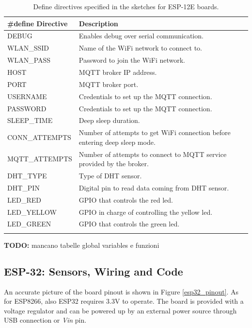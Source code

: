 \noindent\begin{minipage}{\textwidth}
\begingroup
\setlength{\LTleft}{-20cm plus -1fill}
\setlength{\LTright}{\LTleft}
	\begin{longtable}{l | l}
		\hline
		\textbf{\#define Directive} & \textbf{Description} \\
		\hline
		\hline
		DEBUG & Enables debug over serial communication. \\
		\hline
		\hline
		WLAN\_SSID & Name of the WiFi network to connect to. \\
		WLAN\_PASS & Password to join the WiFi network. \\ 
		\hline
		\hline
		HOST & MQTT broker IP address. \\
		PORT & MQTT broker port. \\
		USERNAME & Credentials to set up the MQTT connection. \\
		PASSWORD & Credentials to set up the MQTT connection. \\
		\hline
		\hline
		SLEEP\_TIME & Deep sleep duration. \\
		CONN\_ATTEMPTS & Number of attempts to get WiFi connection before entering deep sleep mode. \\
		MQTT\_ATTEMPTS & Number of attempts to connect to MQTT service provided by the broker. \\
		\hline
		\hline
		DHT\_TYPE & Type of DHT sensor. \\
		DHT\_PIN & Digital pin to read data coming from DHT sensor. \\
		\hline
		\hline
		LED\_RED & GPIO that controls the red led. \\
		LED\_YELLOW & GPIO in charge of controlling the yellow led. \\
		LED\_GREEN & GPIO that controls the green led. \\
		\hline

	\caption{Define directives specified in the sketches for ESP-12E boards.}
	\label{esp12_code_defines}
	\end{longtable}
\endgroup
\end{minipage}

\textbf{TODO:} mancano tabelle global variables e funzioni

\subsection{ESP-32: Sensors, Wiring and Code}
An accurate picture of the board pinout is shown in Figure \ref{esp32_pinout}. As for ESP8266, also ESP32 requires 3.3V to operate. The board is provided with a voltage regulator and can be powered up by an external power source through USB connection or \textit{Vin} pin.

